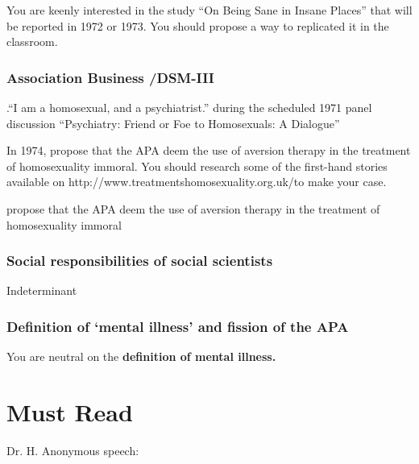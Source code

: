 \begin{refsection}
You are keenly interested in the study “On Being Sane in Insane Places” that will be reported in 1972 or 1973. You should propose a way to replicated it in the classroom.

\subsubsection{Association Business \slash  DSM-III}
\label{associationbusinessdsm-iii}

\begin{writingtask}[Fryer]\label{writingtask:fryer}
.“I am a homosexual, and a psychiatrist.” during the scheduled 1971 panel discussion “Psychiatry: Friend or Foe to Homosexuals: A Dialogue”
\end{writingtask}

In 1974, propose that the APA deem the use of aversion therapy in the treatment of homosexuality immoral. You should research some of the first-hand stories available on http:\slash \slash www.treatmentshomosexuality.org.uk\slash  to make your case.

\begin{proposal}[Fryer]\label{proposal:fryer}
propose that the APA deem the use of aversion therapy in the treatment of homosexuality immoral\end{proposal}

\subsubsection{Social responsibilities of social scientists}
\label{socialresponsibilitiesofsocialscientists}

Indeterminant

\subsubsection{Definition of ‘mental illness’ and fission of the APA}
\label{definitionof‘mentalillness’andfissionoftheapa}

You are neutral on the \textbf{definition of mental illness.}

\section{Must Read}
\label{mustread}

Dr. H. Anonymous speech:

\begin{quote}


\end{quote}
\end{refsection}
